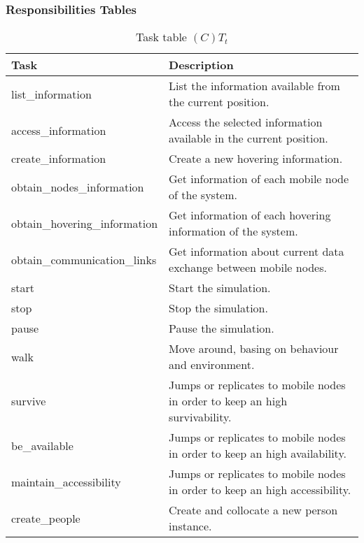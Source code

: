 \subsubsection*{Responsibilities Tables}

\begin{table}[H]
	\centering
	\begin{tabular}{|p{5cm}|p{7cm}|}
			\hline
			\textbf{Task} & \textbf{Description} \\
			\hline
			list\_information & List the information available from the current
			position.\\
			\hline
			access\_information & Access the selected information available in the
			current position.\\
			\hline
			create\_information & Create a new hovering information. \\
			\hline
			obtain\_nodes\_information & Get information of each mobile node of the
			system.\\
			\hline
			obtain\_hovering\_information & Get information of each hovering
			information of the system. \\
			\hline
			obtain\_communication\_links & Get information about current data exchange
			between mobile nodes. \\
			\hline
			start & Start the simulation. \\
			\hline
			stop & Stop the simulation. \\
			\hline
			pause & Pause the simulation. \\
			\hline
			walk & Move around, basing on behaviour and environment. \\
			\hline
			survive & Jumps or replicates to mobile nodes in order to keep an high
			survivability. \\
			\hline
			be\_available & Jumps or replicates to mobile nodes in order to keep an
			high availability. \\
			\hline
			maintain\_accessibility & Jumps or replicates to mobile nodes in order to
			keep an high accessibility. \\
			\hline
			create\_people & Create and collocate a new person instance. \\
			\hline
		\end{tabular}
	\caption{Task table $(C)T_t$}
	\label{tab:ctt}
\end{table}

